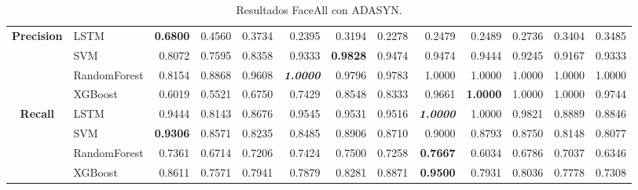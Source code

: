 \begin{table}[H]
\begin{adjustbox}{max width=12cm}
\begin{tabular}{|c|l|r|r|r|r|r|r|r|r|r|r|r|}
			\hline
			\textbf{Precision} & LSTM &  \textbf{0.6800} &  0.4560 &  0.3734 &  0.2395 &  0.3194 &  0.2278 &  0.2479 &  0.2489 &  0.2736 &  0.3404 &  0.3485 \\
			& SVM &  0.8072 &  0.7595 &  0.8358 &  0.9333 &  \textbf{0.9828} &  0.9474 &  0.9474 &  0.9444 &  0.9245 &  0.9167 &  0.9333 \\
			& RandomForest &  0.8154 &  0.8868 &  0.9608 &  \textit{\textbf{1.0000}} &  0.9796 &  0.9783 &  1.0000 &  1.0000 &  1.0000 &  1.0000 &  1.0000 \\
			& XGBoost &  0.6019 &  0.5521 &  0.6750 &  0.7429 &  0.8548 &  0.8333 &  0.9661 &  \textbf{1.0000} &  1.0000 &  1.0000 &  0.9744 \\
			\hline
			\textbf{Recall} & LSTM &  0.9444 &  0.8143 &  0.8676 &  0.9545 &  0.9531 &  0.9516 &  \textit{\textbf{1.0000}} &  1.0000 &  0.9821 &  0.8889 &  0.8846 \\
			& SVM &  \textbf{0.9306} &  0.8571 &  0.8235 &  0.8485 &  0.8906 &  0.8710 &  0.9000 &  0.8793 &  0.8750 &  0.8148 &  0.8077 \\
			& RandomForest &  0.7361 &  0.6714 &  0.7206 &  0.7424 &  0.7500 &  0.7258 &  \textbf{0.7667} &  0.6034 &  0.6786 &  0.7037 &  0.6346 \\
			& XGBoost &  0.8611 &  0.7571 &  0.7941 &  0.7879 &  0.8281 &  0.8871 &  \textbf{0.9500} &  0.7931 &  0.8036 &  0.7778 &  0.7308 \\
			\hline
		\end{tabular}
	\end{adjustbox}	
	\caption{Resultados FaceAll con ADASYN.}
	\label{tab:faceAllADASYN}
\end{table}

